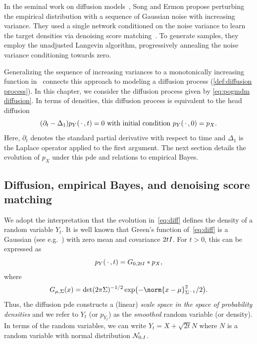 In the seminal work on diffusion models~\cite{song_generative_2019}, Song and Ermon propose perturbing the empirical distribution with a sequence of Gaussian noise with increasing variance.
They used a single network conditioned on the noise variance to learn the target densities via denoising score matching~\cite{vincent_connection_2011}.
To generate samples, they employ the unadjusted Langevin algorithm, progressively annealing the noise variance conditioning towards zero.

Generalizing the sequence of increasing variances to a monotonically increasing function in~\cite{song_scorebased_2021} connects this approach to modeling a diffusion process (\cref{def:diffusion process}).
In this chapter, we consider the diffusion process given by \cref{eq:pogmdm diffusion}.
In terms of densities, this diffusion process is equivalent to the head diffusion
\begin{equation}
	(\partial_t - \Delta_{\num{1}}) p_Y(\,\cdot\,, t) = \num{0}\ \text{with initial condition}\ p_Y(\,\cdot\,, \num{0}) = p_X.
	\label{eq:diff}
\end{equation}
Here, \( \partial_t \) denotes the standard partial derivative with respect to time and \( \Delta_{\num{1}} \) is the Laplace operator applied to the first argument.
The next section details the evolution of \( p_X \) under this \gls{pde} and relations to empirical Bayes.
\subsection{Diffusion, empirical Bayes, and denoising score matching}%
\label{ssec:diffusion empirical bayes}
We adopt the interpretation that the evolution in~\eqref{eq:diff} defines the density of a random variable \( Y_t \).
It is well known that Green's function of~\eqref{eq:diff} is a Gaussian (see e.g.~\cite{cole_green_2010}) with zero mean and covariance \( \num{2}tI \).
For \( t > \num{0} \), this can be expressed as
\begin{equation}
	p_Y(\,\cdot\,, t) = G_{\num{0},\num{2}tI} * p_X,
	\label{eq:convolution with gaussian}
\end{equation}
where
\begin{equation}
	G_{\mu,\Sigma}(x) = \det(\num{2} \pi \Sigma)^{-1/2} \exp\bigl( - \norm{x - \mu}_{\Sigma^{-1}}^{\num{2}} / \num{2} \bigr).
\end{equation}
Thus, the diffusion \gls{pde} constructs a (linear) \emph{scale space in the space of probability densities} and we refer to \( Y_t \) (or \( p_{Y_t} \)) as the \emph{smoothed} random variable (or density).
In terms of the random variables, we can write \( Y_t = X + \sqrt{\num{2}t}N \) where \( N \) is a random variable with normal distribution \( \mathcal{N}_{\num{0}, I} \).

